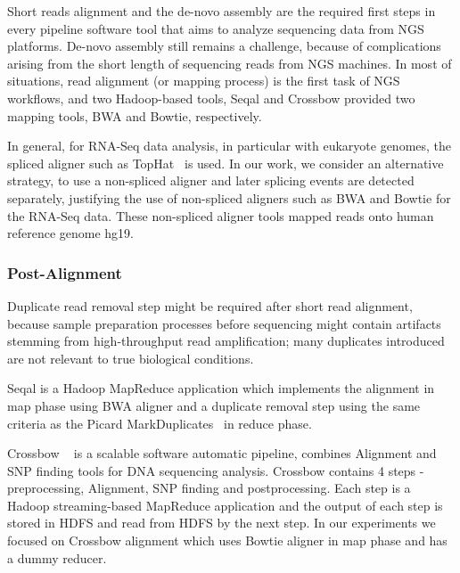 \documentclass{acm_proc_article-sp}
\begin{document}
Short reads alignment and the de-novo assembly are the required first
steps in every pipeline software tool that aims to analyze sequencing
data from NGS platforms.  De-novo assembly still remains a challenge,
because of complications arising from the short length of sequencing
reads from NGS machines. In most of situations, read alignment (or mapping process)
is the first task of NGS workflows, and two Hadoop-based tools, Seqal and Crossbow provided two mapping tools, BWA and Bowtie, respectively. 

In general, for RNA-Seq data analysis, in particular with eukaryote
genomes, the spliced aligner such as TopHat~\cite{pepke2009} is
used. In our work, we consider an alternative strategy, to use a
non-spliced aligner and later splicing events are detected separately,
justifying the use of non-spliced aligners such as BWA and Bowtie for
the RNA-Seq data.  These non-spliced aligner tools mapped reads onto human reference genome hg19.

\subsubsection{Post-Alignment}
Duplicate read removal step might be required after short read
alignment, because sample preparation processes before sequencing
might contain artifacts stemming from high-throughput read
amplification; many duplicates introduced are not relevant to true
biological conditions. 

Seqal is a Hadoop MapReduce application which implements the alignment
in map phase using BWA aligner and a duplicate removal step using the same criteria as the Picard
MarkDuplicates~\cite{seal2011,seal_2011_mapred} in reduce phase. 

Crossbow ~\cite{langmead2009} is a scalable software automatic pipeline, combines Alignment and SNP finding tools for DNA sequencing analysis.
Crossbow contains 4 steps - preprocessing, Alignment, SNP finding and postprocessing.  Each step is a Hadoop streaming-based MapReduce application and the output of each step is stored in HDFS and read from HDFS by the next step.  In our experiments we focused on Crossbow alignment which uses Bowtie aligner in map phase and has a dummy reducer.  
\end{document}
